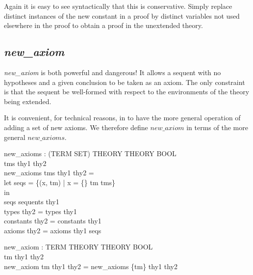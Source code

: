 \documentclass[a4paper,11pt,titlepage]{article}
\begin{document}
\begin{titlepage}
Again it is easy to see syntactically that this is conservative.
Simply replace distinct instances of the new constant
in a proof by distinct variables not used elsewhere
in the proof to obtain a proof in the unextended theory.

\subsection{{\it new\_axiom}}

{\it new\_axiom} is both powerful and dangerous!
It allows a sequent with no hypotheses and a
given conclusion to be taken as an axiom.
The only constraint is that the sequent be well-formed
with respect to the environments of the theory being
extended.

It is convenient, for technical reasons, in \cite{DS/FMU/IED/SPC004} to
have the more general operation of adding a set of
new axioms. We therefore define $new\_axiom$ in terms
of the more general $new\_axioms$.

\begin{HOLConst}
\+	\PrNL{}new\_axioms\PrNN{} : (TERM SET) \MMM{\rightarrow} THEORY \MMM{\rightarrow} THEORY \MMM{\rightarrow} BOOL\\
\PrPH{}
\+	\MMM{\forall} tms thy1 thy2 \MMM{\bullet}\\
\+	new\_axioms tms thy1 thy2 =\\
\+	let seqs = \{(x, tm) | x = \{\} \MMM{\land} tm \MMM{\in} tms\}\\
\+	in\\
\+	seqs \MMM{\subseteq} sequents thy1\MMM{\land}\\
\+	types thy2 = types thy1 \MMM{\land}\\
\+	constants thy2 = constants thy1 \MMM{\land}\\
\+	axioms thy2 = axioms thy1 \MMM{\cup} seqs\\
\end{HOLConst}

\begin{HOLConst}
\+	\PrNL{}new\_axiom\PrNN{} : TERM \MMM{\rightarrow} THEORY \MMM{\rightarrow} THEORY \MMM{\rightarrow} BOOL\\
\PrPH{}
\+	\MMM{\forall} tm thy1 thy2 \MMM{\bullet}\\
\+	new\_axiom tm thy1 thy2 = new\_axioms \{tm\} thy1 thy2\\
\end{HOLConst}

\end{titlepage}
\end{document}
